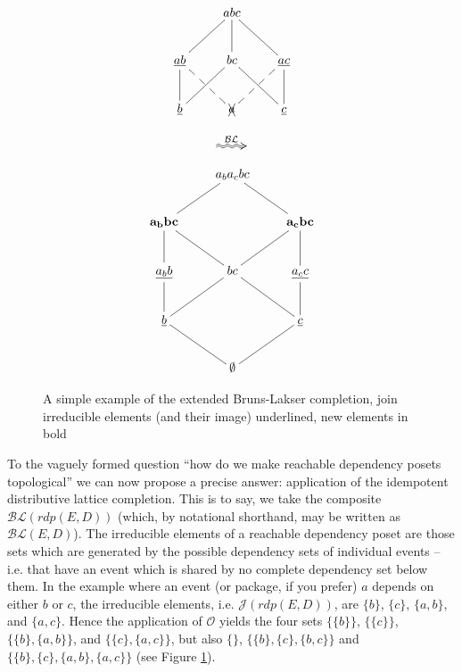 \documentclass[hoptionsi,review,screen,format=sigconf]{acmart}
\theoremstyle{definition}
\newcommand{\Oc}{\mathcal{O}}
\newcommand{\Jc}{\mathcal{J}}
\newcommand{\BLc}{\mathcal{BL}}
\begin{document}
\begin{figure}
\begin{minipage}[c]{0.3\textwidth}
\begin{equation*}
    \xymatrix{& abc \ar@{-}[dl] \ar@{-}[d] \ar@{-}[dr] & \\
      \underline{ab} \ar@{-}[d] \ar@{--}[dr] & bc \ar@{-}[dl] \ar@{-}[dr] &
        \underline{ac} \ar@{-}[d] \ar@{--}[dl] \\
        \underline{b} & \xcancel{a}  & \underline{c} }         
\end{equation*}
\end{minipage}
\begin{minipage}[c]{0.08\textwidth}
  \begin{equation*}
    \xymatrix{\ar@2{~>}[r]^{\BLc} &}
  \end{equation*}
\end{minipage}
\begin{minipage}[c]{0.3\textwidth}
\begin{equation*}
    \xymatrix{& a_ba_cbc \ar@{-}[dl]  \ar@{-}[dr] & \\
      \mathbf{a_bbc} \ar@{-}[d] \ar@{-}[dr] & &
        \mathbf{a_cbc} \ar@{-}[d] \ar@{-}[dl]\\
        \underline{a_bb} \ar@{-}[d] & bc \ar@{-}[dl] \ar@{-}[dr] &
          \underline{a_cc} \ar@{-}[d] \\
         \underline{b} \ar@{-}[dr] & & \underline{c} \ar@{-}[dl] \\
      & \mathbf{\emptyset} }
\end{equation*}
\end{minipage}
\caption{A simple example of the extended Bruns-Lakser completion, join irreducible elements (and their image) underlined, new elements in bold}
\label{Fig1}
\end{figure}



To the vaguely formed question ``how do we make reachable dependency posets topological'' we can now propose a precise answer: application of the idempotent distributive lattice completion. This is to say, we take the composite \(\BLc(rdp(E,D))\) (which, by notational shorthand, may be written as \(\BLc(E,D)\)). The irreducible elements of a reachable dependency poset are those sets which are generated by the possible dependency sets of individual events -- i.e. that have an event which is shared by no complete dependency set below them. In the example where an event (or package, if you prefer) \(a\) depends on either \(b\) or \(c\), the irreducible elements, i.e. \(\Jc(rdp(E,D))\), are \(\{b\}\), \(\{c\}\), \(\{a,b\}\), and \(\{a,c\}\). Hence the application of \(\Oc\) yields the four sets \(\{\{b\}\}\), \(\{\{c\}\}\), \(\{\{b\},\{a,b\}\}\), and \(\{\{c\},\{a,c\}\}\), but also \(\{\}\), \(\{\{b\},\{c\},\{b,c\}\}\) and \(\{\{b\},\{c\},\{a,b\},\{a,c\}\}\) (see Figure \ref{Fig1}).
\end{document}
